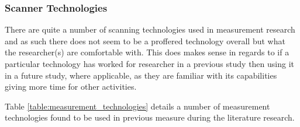 \documentclass{mscreport}
\begin{document}
\subsubsection{Scanner Technologies}

\noindent
There are quite a number of scanning technologies used in measurement research and as such there does not seem to be a proffered technology overall but what the researcher(s) are comfortable with. This does makes sense in regards to if a particular technology has worked for researcher in a previous study then using it in a future study, where applicable, as they are familiar with its capabilities giving more time for other activities.

\vspace{0.3cm} \noindent
Table \ref{table:measurement_technologies} details a number of measurement technologies found to be used in previous measure during the literature research.

\clearpage
\newpage
\end{document}
